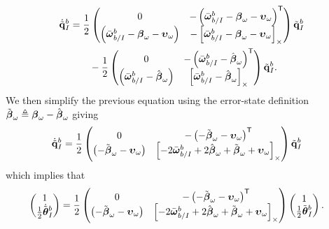 \begin{align}
  \dot{\tilde{\boldsymbol{\mathrm{q}}}}_I^b &=
  \frac{1}{2}
  \begin{pmatrix}
    0 & -\left( \bar{\boldsymbol{\mathrm{\omega}}}_{b/I}^b - \boldsymbol{\mathrm{\beta}}_\omega -
      \boldsymbol{\mathrm{\upsilon}}_\omega
    \right)^{\mathsf{T}} \\
      \left( \bar{\boldsymbol{\mathrm{\omega}}}_{b/I}^b - \boldsymbol{\mathrm{\beta}}_\omega -
    \boldsymbol{\mathrm{\upsilon}}_\omega \right) &
    -\left[ \bar{\boldsymbol{\mathrm{\omega}}}_{b/I}^b - \boldsymbol{\mathrm{\beta}}_\omega -
    \boldsymbol{\mathrm{\upsilon}}_\omega  \right]_{\times}
  \end{pmatrix}
  \tilde{\boldsymbol{\mathrm{q}}}_I^b \\
                       & \qquad - \frac{1}{2}
  \begin{pmatrix}
    0 & -\left( \bar{\boldsymbol{\mathrm{\omega}}}_{b/I}^b - \hat{\boldsymbol{\mathrm{\beta}}}_\omega
    \right)^{\mathsf{T}} \\
      \left( \bar{\boldsymbol{\mathrm{\omega}}}_{b/I}^b - \hat{\boldsymbol{\mathrm{\beta}}}_\omega \right) &
      \left[ \bar{\boldsymbol{\mathrm{\omega}}}_{b/I}^b - \hat{\boldsymbol{\mathrm{\beta}}}_\omega  \right]_{\times}
  \end{pmatrix}
  \tilde{\boldsymbol{\mathrm{q}}}_I^b.
  \nonumber
\end{align}
We then simplify the previous equation using the error-state definition
$\tilde{\boldsymbol{\mathrm{\beta}}}_\omega \triangleq \boldsymbol{\mathrm{\beta}}_\omega -
\hat{\boldsymbol{\mathrm{\beta}}}_\omega$ giving
\begin{align}
  \dot{\tilde{\boldsymbol{\mathrm{q}}}}_I^b &=
  \frac{1}{2}
  \begin{pmatrix}
    0 & -\left( - \tilde{\boldsymbol{\mathrm{\beta}}}_\omega -
      \boldsymbol{\mathrm{\upsilon}}_\omega
    \right)^{\mathsf{T}} \\
    \left( - \tilde{\boldsymbol{\mathrm{\beta}}}_\omega -
    \boldsymbol{\mathrm{\upsilon}}_\omega \right) &
    \left[  -2\bar{\boldsymbol{\mathrm{\omega}}}_{b/I}^b + 2\hat{\boldsymbol{\mathrm{\beta}}}_\omega
      + \tilde{\boldsymbol{\mathrm{\beta}}}_\omega + \boldsymbol{\mathrm{\upsilon}}_\omega  \right]_{\times}
  \end{pmatrix}
  \tilde{\boldsymbol{\mathrm{q}}}_I^b
\end{align}
which implies that
\begin{align}
  \begin{pmatrix}
    1 \\
    \frac{1}{2} \dot{\tilde{\boldsymbol{\mathrm{\theta}}}}_I^b
  \end{pmatrix}
  &=
  \frac{1}{2}
  \begin{pmatrix}
    0 & -\left( - \tilde{\boldsymbol{\mathrm{\beta}}}_\omega -
      \boldsymbol{\mathrm{\upsilon}}_\omega
    \right)^{\mathsf{T}} \\
    \left( - \tilde{\boldsymbol{\mathrm{\beta}}}_\omega -
    \boldsymbol{\mathrm{\upsilon}}_\omega \right) &
    \left[  -2\bar{\boldsymbol{\mathrm{\omega}}}_{b/I}^b + 2\hat{\boldsymbol{\mathrm{\beta}}}_\omega
      + \tilde{\boldsymbol{\mathrm{\beta}}}_\omega + \boldsymbol{\mathrm{\upsilon}}_\omega  \right]_{\times}
  \end{pmatrix}
  \begin{pmatrix}
    1 \\
    \frac{1}{2} \tilde{\boldsymbol{\mathrm{\theta}}}_I^b
  \end{pmatrix}.
\end{align}
